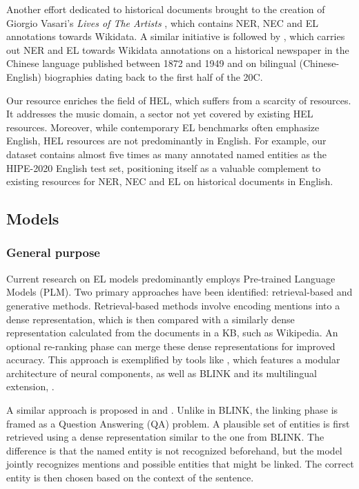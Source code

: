 Another effort dedicated to historical documents brought to the creation of Giorgio Vasari's \textit{Lives of The Artists} \citep{santini2022vasari}, which contains NER, NEC and EL annotations towards Wikidata.
A similar initiative is followed by \citet{blouin-etal-2024-dataset-named}, which carries out NER and EL towards Wikidata annotations on a historical newspaper in the Chinese language published between 1872 and 1949 and on bilingual (Chinese-English) biographies dating back to the first half of the 20C.

Our resource enriches the field of HEL, which suffers from a scarcity of resources. It addresses the music domain, a sector not yet covered by existing HEL resources. Moreover, while contemporary EL benchmarks often emphasize English, HEL resources are not predominantly in English. For example, our dataset contains almost five times as many annotated named entities as the HIPE-2020 English test set, positioning itself as a valuable complement to existing resources for NER, NEC and EL on historical documents in English.
 
\subsection{Models} \label{sec:related:models}
\subsubsection*{General purpose}
Current research on EL models predominantly employs Pre-trained Language Models (PLM). Two primary approaches have been identified: retrieval-based and generative methods. Retrieval-based methods involve encoding mentions into a dense representation, which is then compared with a similarly dense representation calculated from the documents in a KB, such as Wikipedia. An optional re-ranking phase can merge these dense representations for improved accuracy. This approach is exemplified by tools like \citep[REL]{REL2020}, which features a modular architecture of neural components, as well as BLINK and its multilingual extension, \citep[BELA]{plekhanov2023multilingual}.

A similar approach is proposed in \citep[EntQA]{zhang2022entqa} and \citep[ReLiK]{Orlando2024}. Unlike in BLINK, the linking phase is framed as a Question Answering (QA) problem.
A plausible set of entities is first retrieved using a dense representation similar to the one from BLINK.
The difference is that the named entity is not recognized beforehand, but the model jointly recognizes mentions and possible entities that might be linked.
The correct entity is then chosen based on the context of the sentence.

